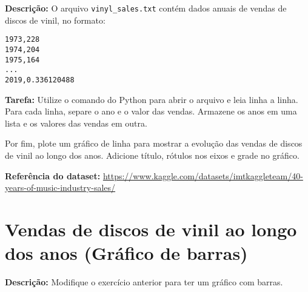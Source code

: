\textbf{Descrição:}  
O arquivo \texttt{vinyl\_sales.txt} contém dados anuais de vendas de discos de vinil, no formato:

\begin{verbatim}
1973,228
1974,204
1975,164
...
2019,0.336120488
\end{verbatim}

\textbf{Tarefa:}  
Utilize o comando do Python para abrir o arquivo e leia linha a linha.  
Para cada linha, separe o ano e o valor das vendas.  
Armazene os anos em uma lista e os valores das vendas em outra.  

Por fim, plote um gráfico de linha para mostrar a evolução das vendas de discos de vinil ao longo dos anos.  
Adicione título, rótulos nos eixos e grade no gráfico.

\textbf{Referência do dataset:}  
\url{https://www.kaggle.com/datasets/imtkaggleteam/40-years-of-music-industry-sales/}

\section{Vendas de discos de vinil ao longo dos anos (Gráfico de barras)}

\textbf{Descrição:}  
Modifique o exercício anterior para ter um gráfico com barras.


